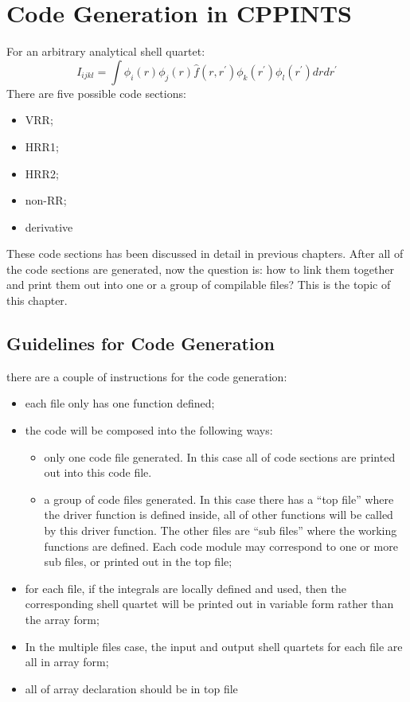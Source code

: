 


\chapter{Code Generation in CPPINTS}

For an arbitrary analytical shell quartet:
\begin{equation}
 I_{ijkl} = \int \phi_{i}(r)\phi_{j}(r)\hat{f}(r,r^{'})\phi_{k}(r^{'})\phi_{l}(r^{'}) dr dr^{'}
\end{equation}
There are five possible code sections:
\begin{itemize}
 \item VRR;
 \item HRR1;
 \item HRR2;
 \item non-RR;
 \item derivative
\end{itemize}
These code sections has been discussed in detail in previous chapters. After all of 
the code sections are generated, now the question is: how to link them together 
and print them out into one or a group of compilable files? This is the topic
of this chapter.

\section{Guidelines for Code Generation}
\label{code_generation_guide}

there are a couple of instructions for the code generation:
\begin{itemize}
 \item each file only has one function defined;
 \item the code will be composed into the following ways:
 \begin{itemize}
  \item only one code file generated. In this case all of code sections are 
  printed out into this code file.
  \item a group of code files generated. In this case there has a ``top file''
  where the driver function is defined inside, all of other functions will be 
  called by this driver function. The other files are ``sub files'' where
  the working functions are defined. Each code module may correspond to one 
  or more sub files, or printed out in the top file;
 \end{itemize}
 \item for each file, if the integrals are locally defined and used, then the 
 corresponding shell quartet will be printed out in variable form rather 
 than the array form;
 \item In the multiple files case, the input and output shell quartets for 
 each file are all in array form;
 \item all of array declaration should be in top file
\end{itemize}

